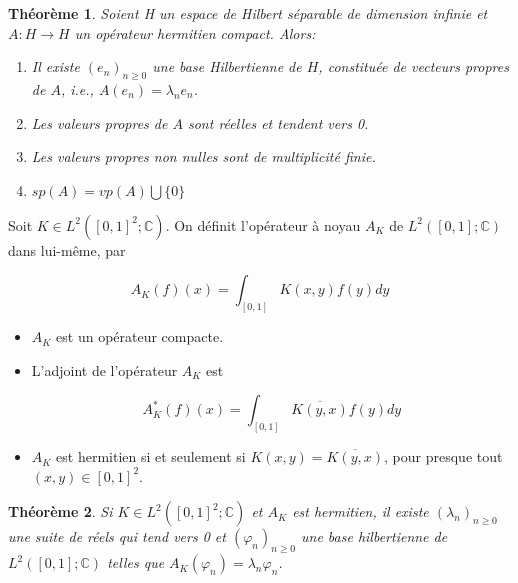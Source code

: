 \documentclass[10pt,a4paper,oneside]{article}
\newtheorem{theoreme}{Théorème}
\newenvironment{definition}[1][Definition]{\begin{trivlist}
\item[\hskip \labelsep {\bfseries #1}]}{\end{trivlist}}
\begin{document}
\begin{theoreme}
Soient H un espace de Hilbert séparable de dimension infinie et $A: H \to H$ un opérateur hermitien compact. Alors:

\begin{enumerate}
\item
Il existe $(e_n)_{n \geq 0}$ une base Hilbertienne de $H$, constituée de vecteurs propres de $A$, i.e., $A(e_n) = \lambda_n e_n$.

\item
Les valeurs propres de $A$ sont réelles et tendent vers 0.

\item
Les valeurs propres non nulles sont de multiplicité finie.

\item
$sp(A) = vp(A) \bigcup \{ 0 \}$

\end{enumerate}

\end{theoreme}


\begin{definition}
Soit $K \in L^2([0,1]^2;\mathbb{C})$. On définit l'opérateur à noyau $A_{K}$ de $L^2([0,1];\mathbb{C})$ dans lui-même, par

\[
A_{K}(f)(x) = \int_{[0,1]} K(x,y)f(y)dy
\]

\begin{itemize}

\item
$A_K$ est un opérateur compacte.

\item
L'adjoint de l'opérateur $A_{K}$ est

\[
A^{*}_{K}(f)(x) = \int_{[0,1]} \overline{K(y,x)}f(y)dy
\]

\item
$A_K$ est hermitien si et seulement si $K(x,y) = \overline{K(y,x)}$, pour presque tout $(x,y) \in [0,1]^2$.

\end{itemize}

\end{definition}

\begin{theoreme}
Si $K \in L^2([0,1]^2;\mathbb{C})$ et $A_K$ est hermitien, il existe $(\lambda_n)_{n \geq 0}$ une suite de réels qui tend vers 0 et $(\varphi_n)_{n \geq 0}$ une base hilbertienne de $L^2([0,1];\mathbb{C})$ telles que $A_K(\varphi_n) = \lambda_n \varphi_n$.

\end{theoreme}
\end{document}
